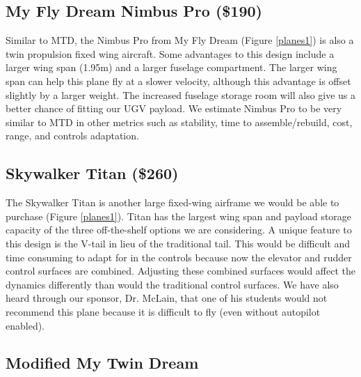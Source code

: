 \documentclass[]{auvsi_doc}
\begin{document}
\subsection{My Fly Dream Nimbus Pro (\$190)}

Similar to MTD, the Nimbus Pro from My Fly Dream (Figure \ref{planes1}) is also a twin propulsion fixed wing aircraft. Some advantages to this design include a larger wing span (1.95m) and a larger fuselage compartment. The larger wing span can help this plane fly at a slower velocity, although this advantage is offset slightly by a larger weight. The increased fuselage storage room will also give us a better chance of fitting our UGV payload. We estimate Nimbus Pro to be very similar to MTD in other metrics such as stability, time to assemble/rebuild, cost, range, and controls adaptation.

\subsection{Skywalker Titan (\$260)}

The Skywalker Titan is another large fixed-wing airframe we would be able to purchase (Figure \ref{planes1}). Titan has the largest wing span and payload storage capacity of the three off-the-shelf options we are considering. A unique feature to this design is the V-tail in lieu of the traditional tail. This would be difficult and time consuming to adapt for in the controls because now the elevator and rudder control surfaces are combined. Adjusting these combined surfaces would affect the dynamics differently than would the traditional control surfaces. We have also heard through our sponsor, Dr. McLain, that one of his students would not recommend this plane because it is difficult to fly (even without autopilot enabled).

\subsection{Modified My Twin Dream}
\end{document}
